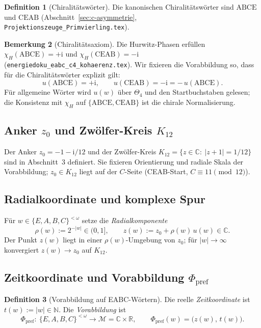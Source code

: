 \documentclass[11pt,a4paper]{article}
\theoremstyle{definition}
\newtheorem{definition}{Definition}[section]
\newtheorem{bemerkung}[definition]{Bemerkung}
\theoremstyle{remark}
\newcommand{\N}{\mathbb{N}}
\newcommand{\R}{\mathbb{R}}
\newcommand{\C}{\mathbb{C}}
\newcommand{\SigmaEABC}{\{E,A,B,C\}}
\newcommand{\Phpref}{\Phi_{\mathrm{pref}}}
\begin{document}
\begin{definition}[Chiralitätswörter]
Die kanonischen Chiralitätswörter sind
$\mathrm{ABCE}$ und $\mathrm{CEAB}$ (Abschnitt~\ref{sec:c-asymmetrie},
\texttt{Projektionszeuge\_Primvierling.tex}).
\end{definition}

\begin{bemerkung}[Chiralitätsaxiom]
Die Hurwitz-Phasen erfüllen
$\chi_H(\mathrm{ABCE})=+\mathrm{i}$ und
$\chi_H(\mathrm{CEAB})=-\mathrm{i}$
(\texttt{energiedoku\_eabc\_c4\_kohaerenz.tex}).
Wir fixieren die Vorabbildung so, dass für die Chiralitätswörter
explizit gilt:
\[
u(\mathrm{ABCE})=+\mathrm{i},\qquad
u(\mathrm{CEAB})=-\mathrm{i}=-\,u(\mathrm{ABCE}).
\]
Für allgemeine Wörter wird $u(w)$ über $\Theta_{4}$ und den
Startbuchstaben gelesen; die Konsistenz mit $\chi_H$ auf
$\{\mathrm{ABCE},\mathrm{CEAB}\}$ ist die chirale Normalisierung.
\end{bemerkung}

\subsection{Anker \texorpdfstring{$z_0$}{z0} und Zwölfer-Kreis \texorpdfstring{$K_{12}$}{K12}}

Der Anker $z_0=-1-\mathrm{i}/12$ und der Zwölfer-Kreis
$K_{12}=\{z\in\C:\ |z+1|=1/12\}$ sind in
Abschnitt~3 definiert. Sie fixieren Orientierung und radiale
Skala der Vorabbildung; $z_0\in K_{12}$ liegt auf der
$C$-Seite (CEAB-Start, $C\equiv 11\pmod{12}$).

\subsection{Radialkoordinate und komplexe Spur}

Für $w\in\SigmaEABC^{<\omega}$ setze die \emph{Radialkomponente}
\[
\rho(w):=2^{-|w|}\in(0,1],
\qquad
z(w):=z_0+\rho(w)\,u(w)\in\C.
\]
Der Punkt $z(w)$ liegt in einer $\rho(w)$-Umgebung von $z_0$;
für $|w|\to\infty$ konvergiert $z(w)\to z_0$ auf $K_{12}$.

\subsection{Zeitkoordinate und Vorabbildung \texorpdfstring{$\Phpref$}{Phi\_pref}}

\begin{definition}[Vorabbildung auf EABC-Wörtern]
Die reelle \emph{Zeitkoordinate} ist $t(w):=|w|\in\N$.
Die \emph{Vorabbildung} ist
\[
\boxed{\;
\Phpref:\ \SigmaEABC^{<\omega}\longrightarrow \mathcal{M}=\C\times\R,\qquad
\Phpref(w)=\bigl(z(w),\,t(w)\bigr).
\;}
\]
\end{definition}
\end{document}
